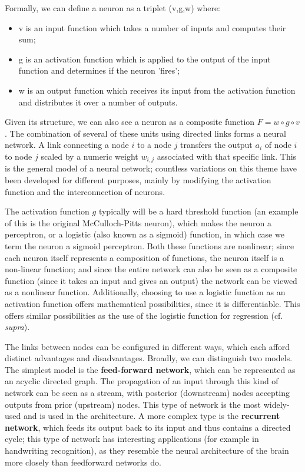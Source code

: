 Formally, we can define a neuron as a triplet (v,g,w) where:

\begin{itemize}
\item v is an input function which takes a number of inputs and computes their sum;
\item g is an activation function which is applied to the output of the input function and determines if the neuron 'fires';
\item w is an output function which receives its input from the activation
  function and distributes it over a number of outputs.
\end{itemize}

Given its structure, we can also see a neuron as a composite function
$F = w \circ g \circ v$. The combination of several of these units
using directed links forms a neural network. A link connecting a node
$i$ to a node $j$ transfers the output $a_i$ of node $i$ to node $j$
scaled by a numeric weight $w_{i,j}$ associated with that specific
link. This is the general model of a neural network; countless
variations on this theme have been developed for different purposes,
mainly by modifying the activation function and the interconnection of
neurons.

The activation function $g$ typically will be a hard threshold
function (an example of this is the original McCulloch-Pitts neuron),
which makes the neuron a perceptron, or a logistic (also known as a
sigmoid) function, in which case we term the neuron a sigmoid
perceptron. Both these functions are nonlinear; since each neuron
itself represents a composition of functions, the neuron itself is a
non-linear function; and since the entire network can also be seen as
a composite function (since it takes an input and gives an output) the
network can be viewed as a nonlinear function. Additionally, choosing
to use a logistic function as an activation function offers
mathematical possibilities, since it is differentiable. This offers
similar possibilities as the use of the logistic function for
regression (cf. \textit{supra}).

The links between nodes can be configured in different ways, which
each afford distinct advantages and disadvantages. Broadly, we can
distinguish two models. The simplest model is the \textbf{feed-forward
  network}, which can be represented as an acyclic directed graph. The
propagation of an input through this kind of network can be seen as a
stream, with posterior (downstream) nodes accepting outputs from prior
(upstream) nodes. This type of network is the most widely-used and is
used in the architecture. A more complex type is the \textbf{recurrent
  network}, which feeds its output back to its input and thus contains a
directed cycle; this type of network has interesting applications (for
example in handwriting recognition), as they resemble the neural
architecture of the brain more closely than feedforward networks do.

